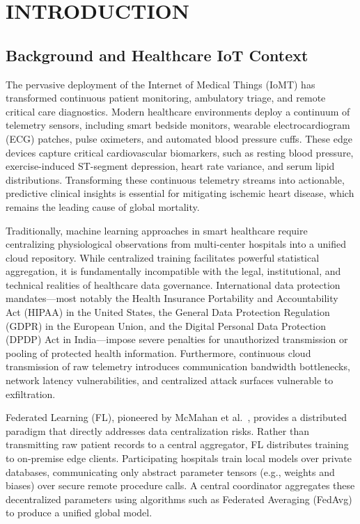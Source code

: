 \documentclass[12pt,a4paper,oneside]{report}
\begin{document}


\chapter{INTRODUCTION}

\section{Background and Healthcare IoT Context}
The pervasive deployment of the Internet of Medical Things (IoMT) has transformed continuous patient monitoring, ambulatory triage, and remote critical care diagnostics. Modern healthcare environments deploy a continuum of telemetry sensors, including smart bedside monitors, wearable electrocardiogram (ECG) patches, pulse oximeters, and automated blood pressure cuffs. These edge devices capture critical cardiovascular biomarkers, such as resting blood pressure, exercise-induced ST-segment depression, heart rate variance, and serum lipid distributions. Transforming these continuous telemetry streams into actionable, predictive clinical insights is essential for mitigating ischemic heart disease, which remains the leading cause of global mortality.

Traditionally, machine learning approaches in smart healthcare require centralizing physiological observations from multi-center hospitals into a unified cloud repository. While centralized training facilitates powerful statistical aggregation, it is fundamentally incompatible with the legal, institutional, and technical realities of healthcare data governance. International data protection mandates—most notably the Health Insurance Portability and Accountability Act (HIPAA) in the United States, the General Data Protection Regulation (GDPR) in the European Union, and the Digital Personal Data Protection (DPDP) Act in India—impose severe penalties for unauthorized transmission or pooling of protected health information. Furthermore, continuous cloud transmission of raw telemetry introduces communication bandwidth bottlenecks, network latency vulnerabilities, and centralized attack surfaces vulnerable to exfiltration.

Federated Learning (FL), pioneered by McMahan et al.~\cite{mcmahan2017communication}, provides a distributed paradigm that directly addresses data centralization risks. Rather than transmitting raw patient records to a central aggregator, FL distributes training to on-premise edge clients. Participating hospitals train local models over private databases, communicating only abstract parameter tensors (e.g., weights and biases) over secure remote procedure calls. A central coordinator aggregates these decentralized parameters using algorithms such as Federated Averaging (FedAvg) to produce a unified global model.
\end{document}
